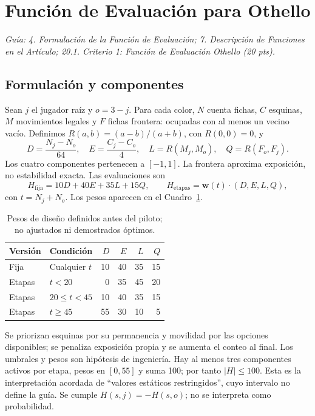 \section{Función de Evaluación para Othello}
\textit{Guía: 4. Formulación de la Función de Evaluación; 7. Descripción de Funciones en el Artículo; 20.1. Criterio 1: Función de Evaluación Othello (20 pts).}
\subsection{Formulación y componentes}
Sean $j$ el jugador raíz y $o=3-j$. Para cada color, $N$ cuenta fichas, $C$ esquinas, $M$ movimientos legales y $F$ fichas frontera: ocupadas con al menos un vecino vacío. Definimos $R(a,b)=(a-b)/(a+b)$, con $R(0,0)=0$, y
\begin{equation}
 D=\frac{N_j-N_o}{64},\quad E=\frac{C_j-C_o}{4},\quad
 L=R(M_j,M_o),\quad Q=R(F_o,F_j).
 \label{eq:othello_componentes}
\end{equation}
Los cuatro componentes pertenecen a $[-1,1]$. La frontera aproxima exposición, no estabilidad exacta. Las evaluaciones son
\begin{equation}
 H_{\mathrm{fija}}=10D+40E+35L+15Q,\qquad
 H_{\mathrm{etapas}}=\boldsymbol{w}(t)\cdot(D,E,L,Q),
 \label{eq:othello_dos_funciones}
\end{equation}
con $t=N_j+N_o$. Los pesos aparecen en el Cuadro~\ref{tab:othello_pesos}.
\begin{table}[htbp]
\centering\small
\caption{Pesos de diseño definidos antes del piloto; no ajustados ni demostrados óptimos.}
\label{tab:othello_pesos}
\begin{tabular}{llrrrr}
\toprule
Versión & Condición & $D$ & $E$ & $L$ & $Q$\\
\midrule
Fija & Cualquier $t$ & 10 & 40 & 35 & 15\\
Etapas & $t<20$ & 0 & 35 & 45 & 20\\
Etapas & $20\leq t<45$ & 10 & 40 & 35 & 15\\
Etapas & $t\geq45$ & 55 & 30 & 10 & 5\\
\bottomrule
\end{tabular}
\end{table}
Se priorizan esquinas por su permanencia y movilidad por las opciones disponibles; se penaliza exposición propia y se aumenta el conteo al final. Los umbrales y pesos son hipótesis de ingeniería. Hay al menos tres componentes activos por etapa, pesos en $[0,55]$ y suma 100; por tanto $|H|\leq100$. Esta es la interpretación acordada de ``valores estáticos restringidos'', cuyo intervalo no define la guía. Se cumple $H(s,j)=-H(s,o)$; no se interpreta como probabilidad.

